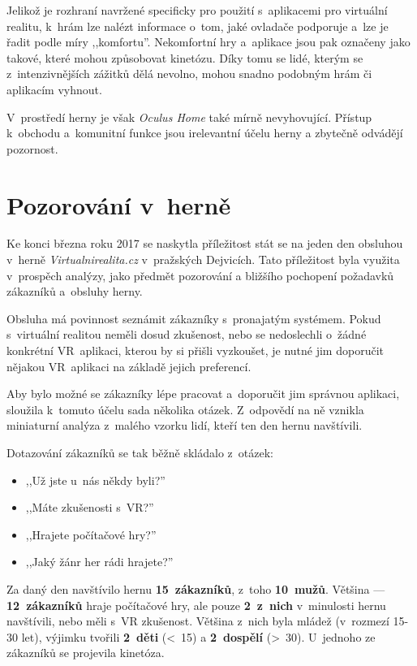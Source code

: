 Jelikož je rozhraní navržené specificky pro použití s~aplikacemi pro
virtuální realitu, k~hrám lze nalézt informace o~tom, jaké ovladače
podporuje a~lze je řadit podle míry ,,komfortu''. Nekomfortní hry a~aplikace jsou
pak označeny jako takové, které mohou způsobovat kinetózu. Díky tomu se
lidé, kterým se z~intenzivnějších zážitků dělá nevolno, mohou snadno podobným
hrám či aplikacím vyhnout.

V~prostředí herny je však \emph{Oculus Home} také mírně nevyhovující.
Přístup k~obchodu a~komunitní funkce jsou irelevantní účelu herny a
zbytečně odvádějí pozornost.

\section{Pozorování v~herně}\label{pozorovuxe1nuxed-v-hernux11b}

Ke konci března roku 2017 se naskytla příležitost stát se na jeden den
obsluhou v~herně \emph{Virtualnirealita.cz} v~pražských Dejvicích. Tato
příležitost byla využita v~prospěch analýzy, jako předmět pozorování a
bližšího pochopení požadavků zákazníků a~obsluhy herny.

Obsluha má povinnost seznámit zákazníky s~pronajatým
systémem. Pokud s~virtuální realitou neměli dosud zkušenost, nebo se
nedoslechli o~žádné konkrétní VR~aplikaci, kterou by si přišli
vyzkoušet, je nutné jim doporučit nějakou VR~aplikaci na základě jejich preferencí.

Aby bylo možné se zákazníky lépe pracovat a~doporučit jim správnou
aplikaci, sloužila k~tomuto účelu sada několika otázek. Z~odpovědí na ně vznikla
miniaturní analýza z~malého vzorku lidí, kteří ten den hernu navštívili.

Dotazování zákazníků se tak běžně skládalo z~otázek: 

\begin{itemize}
\tightlist
\item
,,Už jste u~nás
někdy byli?''
\item
  ,,Máte zkušenosti s~VR?''
\item
  ,,Hrajete počítačové hry?''
\item
  ,,Jaký žánr her rádi hrajete?''
\end{itemize}

Za daný den navštívilo hernu \textbf{15~zákazníků}, z~toho \textbf{10~mužů}. 
Většina --- \textbf{12~zákazníků} hraje počítačové hry, ale pouze
\textbf{2~z~nich} v~minulosti hernu navštívili, nebo měli s~VR
zkušenost. Většina z~nich byla mládež (v~rozmezí 15-30 let), výjimku
tvořili \textbf{2~děti} (\textless{}~15) a \textbf{2~dospělí}
(\textgreater{}~30). U~jednoho ze zákazníků se projevila
kinetóza.

